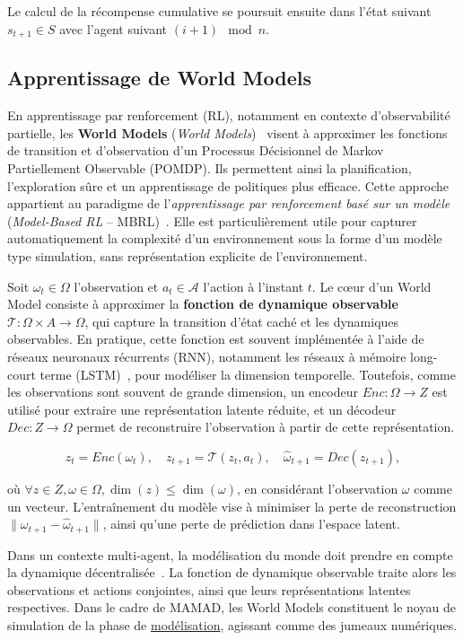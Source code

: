 \documentclass[pdflatex,sn-mathphys-num]{sn-jnl}%
\theoremstyle{thmstyleone}%
\theoremstyle{thmstyletwo}%
\theoremstyle{thmstylethree}%
\begin{document}
Le calcul de la récompense cumulative se poursuit ensuite dans l'état suivant $s_{t+1} \in S$ avec l'agent suivant $(i+1) \mod n$.

\subsection{Apprentissage de World Models}

En apprentissage par renforcement (RL), notamment en contexte d'observabilité partielle, les \textbf{World Models} (\textit{World Models})~\cite{ha2018recurrent} visent à approximer les fonctions de transition et d'observation d'un Processus Décisionnel de Markov Partiellement Observable (POMDP). Ils permettent ainsi la planification, l'exploration sûre et un apprentissage de politiques plus efficace. Cette approche appartient au paradigme de l'\textit{apprentissage par renforcement basé sur un modèle} (\textit{Model-Based RL} – MBRL)~\cite{moerland2020model}. Elle est particulièrement utile pour capturer automatiquement la complexité d'un environnement sous la forme d'un modèle type simulation, sans représentation explicite de l'environnement.

Soit $\omega_t \in \Omega$ l'observation et $a_t \in \mathcal{A}$ l'action à l'instant $t$. Le cœur d'un World Model consiste à approximer la \textbf{fonction de dynamique observable} $\mathcal{T}: \Omega \times A \rightarrow \Omega$, qui capture la transition d'état caché et les dynamiques observables. En pratique, cette fonction est souvent implémentée à l'aide de réseaux neuronaux récurrents (RNN), notamment les réseaux à mémoire long-court terme (LSTM)~\cite{hochreiter1997long}, pour modéliser la dimension temporelle. Toutefois, comme les observations sont souvent de grande dimension, un encodeur $Enc: \Omega \rightarrow Z$ est utilisé pour extraire une représentation latente réduite, et un décodeur $Dec: Z \rightarrow \Omega$ permet de reconstruire l'observation à partir de cette représentation.

\[
    z_t = Enc(\omega_t), \quad
    z_{t+1} = \mathcal{T}(z_t, a_t), \quad
    \hat{\omega}_{t+1} = Dec(z_{t+1}),
\]

où $\forall z \in Z, \omega \in \Omega, \dim(z) \leq \dim(\omega)$, en considérant l'observation $\omega$ comme un vecteur. L'entraînement du modèle vise à minimiser la perte de reconstruction $\|\omega_{t+1} - \hat{\omega}_{t+1}\|$, ainsi qu'une perte de prédiction dans l'espace latent.

Dans un contexte multi-agent, la modélisation du monde doit prendre en compte la dynamique décentralisée~\cite{yang2021representation}. La fonction de dynamique observable traite alors les observations et actions conjointes, ainsi que leurs représentations latentes respectives. Dans le cadre de MAMAD, les World Models constituent le noyau de simulation de la phase de \hyperref[sec:modelling]{modélisation}, agissant comme des jumeaux numériques.
\end{document}
